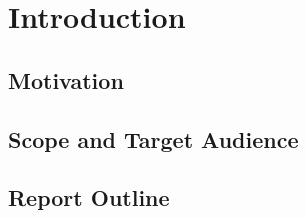 
\chapter{Introduction}

\section{Motivation}

\section{Scope and Target Audience}

\section{Report Outline}

\cleardoublepage